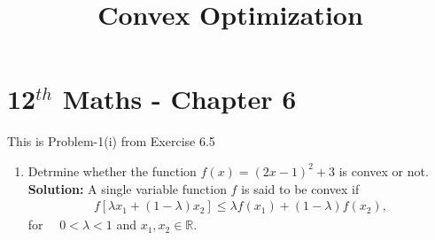 \documentclass[12pt]{article}
\providecommand{\brak}[1]{\ensuremath{\left(#1\right)}}
\providecommand{\sbrak}[1]{\ensuremath{{}\left[#1\right]}}
\newcommand{\solution}{\noindent \textbf{Solution: }}
\begin{document}
\begin{center}
\title{\textbf{Convex Optimization}}
\date{\vspace{-5ex}} %
\maketitle
\end{center}
\setcounter{page}{1}

\section{12$^{th}$ Maths - Chapter 6}
This is Problem-1(i) from Exercise 6.5
\begin{enumerate}
\item Detrmine whether the function $f\brak{x} = \brak{2x-1}^2 + 3$ is convex or not. \\ 
\solution 
A single variable function $f$ is said to be convex if
\begin{align}
	\label{eq:convex_def}
	f\sbrak{\lambda x_1 + \brak{1-\lambda}x_2} \leq \lambda f\brak{x_1} + \brak{1-\lambda}f\brak{x_2},
\end{align}
for $\quad 0 < \lambda < 1$ and $x_1, x_2 \in \mathbb{R}$.


\end{enumerate}
\end{document}
